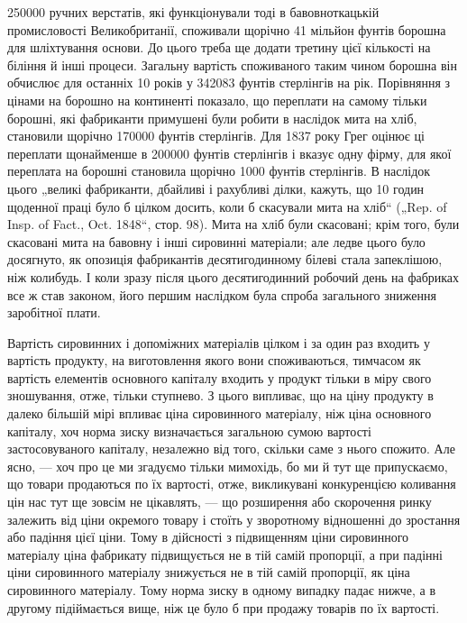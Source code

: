 \parcont{}  %
\num{250000} ручних верстатів, які функціонували тоді в бавовноткацькій
промисловості Великобританії, споживали щорічно 41 мільйон
фунтів борошна для шліхтування основи. До цього треба
ще додати третину цієї кількості на біління й інші процеси.
Загальну вартість споживаного таким чином борошна він обчислює
для останніх 10 років у \num{342083} фунтів стерлінгів на рік.
Порівняння з цінами на борошно на континенті показало, що
переплати на самому тільки борошні, які фабриканти примушені
були робити в наслідок мита на хліб, становили щорічно
\num{170000} фунтів стерлінгів. Для 1837 року Грег оцінює ці
переплати щонайменше в \num{200000} фунтів стерлінгів і вказує
одну фірму, для якої переплата на борошні становила щорічно
1000 фунтів стерлінгів. В наслідок цього „великі фабриканти,
дбайливі і рахубливі ділки, кажуть, що 10 годин щоденної
праці було б цілком досить, коли б скасували мита на хліб“
(„Rep. of Insp. of Fact., Oct. 1848“, стор. 98). Мита на хліб
були скасовані; крім того, були скасовані мита на бавовну
і інші сировинні матеріали; але ледве цього було досягнуто, як
опозиція фабрикантів десятигодинному білеві стала запеклішою,
ніж колибудь. І коли зразу після цього десятигодинний робочий
день на фабриках все ж став законом, його першим наслідком
була спроба загального зниження заробітної плати.

Вартість сировинних і допоміжних матеріалів цілком і за один
раз входить у вартість продукту, на виготовлення якого вони споживаються,
тимчасом як вартість елементів основного капіталу
входить у продукт тільки в міру свого зношування, отже, тільки
ступнево. З цього випливає, що на ціну продукту в далеко більшій
мірі впливає ціна сировинного матеріалу, ніж ціна основного
капіталу, хоч норма зиску визначається загальною сумою вартості
застосовуваного капіталу, незалежно від того, скільки
саме з нього спожито. Але ясно, — хоч про це ми згадуємо
тільки мимохідь, бо ми й тут ще припускаємо, що товари продаються
по їх вартості, отже, викликувані конкуренцією коливання
цін нас тут ще зовсім не цікавлять, — що розширення або
скорочення ринку залежить від ціни окремого товару і стоїть
у зворотному відношенні до зростання або падіння цієї ціни.
Тому в дійсності з підвищенням ціни сировинного матеріалу ціна
фабрикату підвищується не в тій самій пропорції, а при падінні
ціни сировинного матеріалу знижується не в тій самій пропорції,
як ціна сировинного матеріалу. Тому норма зиску в
одному випадку падає нижче, а в другому підіймається вище,
ніж це було б при продажу товарів по їх вартості.

